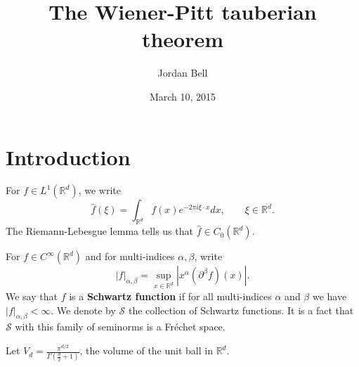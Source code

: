 \documentclass{article}
\theoremstyle{definition}
\begin{document}
\title{The Wiener-Pitt tauberian theorem}
\author{Jordan Bell}
\date{March 10, 2015}

\maketitle

\section{Introduction}
For $f \in L^1(\mathbb{R}^d)$, we write
\[
\hat{f}(\xi) = \int_{\mathbb{R}^d} f(x) e^{-2\pi i\xi\cdot x} dx, \qquad \xi \in \mathbb{R}^d.
\]
The Riemann-Lebesgue lemma tells us that $\hat{f} \in C_0(\mathbb{R}^d)$. 

For $f \in C^\infty(\mathbb{R}^d)$ and for multi-indices $\alpha,\beta$, write
\[
|f|_{\alpha,\beta} = \sup_{x \in \mathbb{R}^d} |x^\alpha (\partial^\beta f)(x)|.
\]
We say that $f$ is a \textbf{Schwartz function} if  for all multi-indices $\alpha$ and $\beta$ we have
$|f|_{\alpha,\beta}<\infty$. We denote by $\mathscr{S}$ the collection of Schwartz functions. It is a fact that 
$\mathscr{S}$
with this family of seminorms is a Fr\'echet space. 

Let $V_d = \frac{\pi^{d/2}}{\Gamma\left( \frac{d}{2}+1 \right)}$, the volume of the unit ball
in $\mathbb{R}^d$. 
\end{document}
